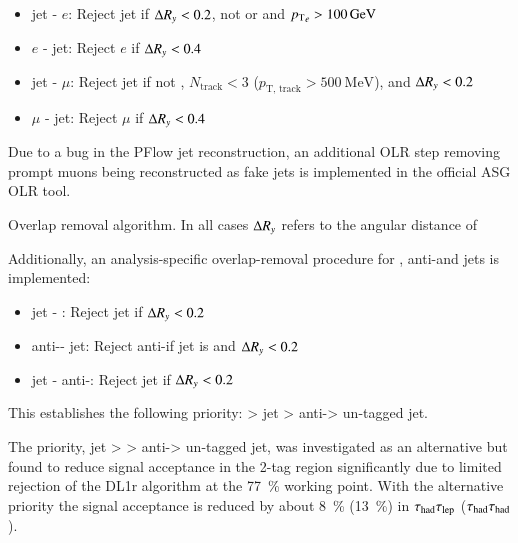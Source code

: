 \begin{itemize}
\item jet - $e$: Reject jet if $\Delta R_y < 0.2$, not \btagged or \btagged and
  ${\pT}_{e} > \SI{100}{\GeV}$
\item $e$ - jet: Reject $e$ if $\Delta R_y < 0.4$

\item jet - $\mu$: Reject jet if not \btagged, $N_\text{track} < 3$ ($p_\text{T,
  track} > \SI{500}{\MeV}$), and $\Delta R_y < 0.2$
\item $\mu$ - jet: Reject $\mu$ if $\Delta R_y < 0.4$
\end{itemize}
Due to a bug in the PFlow jet reconstruction, an additional OLR step removing
prompt muons being reconstructed as fake jets is implemented in the official ASG
OLR tool.

\begin{table}[htbp]
  \centering

  \resizebox{\textwidth}{!}{%
    
  }

  \caption{Overlap removal algorithm. In all cases $\Delta R_y$ refers to
    the angular distance of }
\end{table}

Additionally, an analysis-specific overlap-removal procedure for \tauhadvis,
anti-\tauhadvis and jets is implemented:
\begin{itemize}
\item jet - \tauhadvis: Reject jet if $\Delta R_y < 0.2$
\item anti-\tauhadvis - jet: Reject anti-\tauhad if jet is \btagged and $\Delta R_y <
  0.2$
\item jet - anti-\tauhadvis: Reject jet  if $\Delta R_y < 0.2$
\end{itemize}
This establishes the following priority: \tauhadvis > \btagged jet >
anti-\tauhadvis > un-tagged jet.

The priority, \btagged jet > \tauhadvis > anti-\tauhadvis > un-tagged jet, was
investigated as an alternative but found to reduce signal acceptance in the
2-tag region significantly due to limited \tauhad rejection of the DL1r \btag
algorithm at the \SI{77}{\percent} working point. With the alternative priority
the signal acceptance is reduced by about \SI{8}{\percent} (\SI{13}{\percent})
in $\tau_{\text{had}}\tau_{\text{lep}}$ ($\tau_{\text{had}}\tau_{\text{had}}$).

